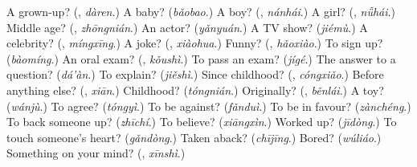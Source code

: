 \begin{tcolorbox}[breakable,colback=teal!4,colframe=teal!35!black,title={Before you move on}]
A grown-up? (\textbf{}, \emph{dàren}.) A baby? (\emph{bǎobao}.) A boy? (\textbf{}, \emph{nánhái}.) A girl? (\textbf{}, \emph{nǚhái}.) Middle age? (\textbf{}, \emph{zhōngnián}.) An actor? (\emph{yǎnyuán}.) A TV show? (\emph{jiémù}.) A celebrity? (\textbf{}, \emph{míngxīng}.) A joke? (\textbf{}, \emph{xiàohua}.) Funny? (\textbf{}, \emph{hǎoxiào}.) To sign up? (\emph{bàomíng}.) An oral exam? (\textbf{}, \emph{kǒushì}.) To pass an exam? (\emph{jígé}.) The answer to a question? (\emph{dá'àn}.) To explain? (\emph{jiěshì}.) Since childhood? (\textbf{}, \emph{cóngxiǎo}.) Before anything else? (\textbf{}, \emph{xiān}.) Childhood? (\emph{tóngnián}.) Originally? (\textbf{}, \emph{běnlái}.) A toy? (\emph{wánjù}.) To agree? (\emph{tóngyì}.) To be against? (\emph{fǎnduì}.) To be in favour? (\emph{zànchéng}.) To back someone up? (\emph{zhīchí}.) To believe? (\emph{xiāngxìn}.) Worked up? (\emph{jīdòng}.) To touch someone's heart? (\emph{gǎndòng}.) Taken aback? (\emph{chījīng}.) Bored? (\emph{wúliáo}.) Something on your mind? (\textbf{}, \emph{xīnshì}.)
\end{tcolorbox}
